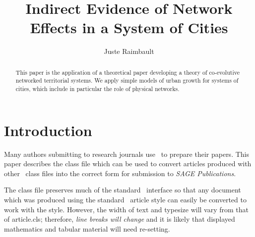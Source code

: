 \documentclass[Afour,sageh,times]{sagej}
\begin{document}

\title{Indirect Evidence of Network Effects in a System of Cities}

\author{Juste Raimbault}




\begin{abstract}
This paper is the application of a theoretical paper developing a theory of co-evolutive networked territorial systems. We apply simple models of urban growth for systems of cities, which include in particular the role of physical networks.
\end{abstract}


\maketitle






\section{Introduction}
Many authors submitting to research journals use \LaTeXe\ to
prepare their papers. This paper describes the
\textsf{\journalclass} class file which can be used to convert
articles produced with other \LaTeXe\ class files into the correct
form for submission to \textit{SAGE Publications}.

The \textsf{\journalclass} class file preserves much of the
standard \LaTeXe\ interface so that any document which was
produced using the standard \LaTeXe\ \textsf{article} style can
easily be converted to work with the \textsf{\journalclassshort}
style. However, the width of text and typesize will vary from that
of \textsf{article.cls}; therefore, \textit{line breaks will change}
and it is likely that displayed mathematics and tabular material
will need re-setting.
\end{document}
